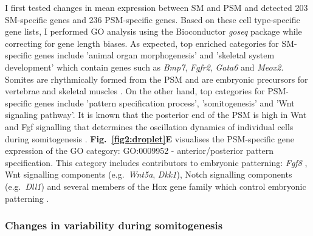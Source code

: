 I first tested changes in mean expression between SM and PSM and detected 203 SM-specific genes and 236 PSM-specific genes. Based on these cell type-specific gene lists, I performed GO analysis using the Bioconductor \emph{goseq} package while correcting for gene length biases. As expected, top enriched categories for SM-specific genes include 'animal organ morphogenesis' and 'skeletal system development' which contain genes such as \textit{Bmp7}, \textit{Fgfr2}, \textit{Gata6} and \textit{Meox2}. Somites are rhythmically formed from the PSM and are embryonic precursors for vertebrae and skeletal muscles \citep{Dequeant2008}. On the other hand, top categories for PSM-specific genes include 'pattern specification process', 'somitogenesis' and 'Wnt signaling pathway'. It is known that the posterior end of the PSM is high in Wnt and Fgf signalling that determines the oscillation dynamics of individual cells during somitogenesis \citep{Oates2012}. \textbf{Fig.~\ref{fig2:droplet}E} visualises the PSM-specific gene expression of the GO category: GO:0009952 - anterior/posterior pattern specification. This category includes contributors to embryonic patterning: \textit{Fgf8} \citep{Dubrulle2004}, Wnt signalling components (e.g.~\textit{Wnt5a}, \textit{Dkk1}), Notch signalling components (e.g.~\textit{Dll1}) \citep{Dequeant2008} and several members of the Hox gene family which control embryonic patterning \citep{Pearson2005}.

\newpage

\subsubsection{Changes in variability during somitogenesis}

